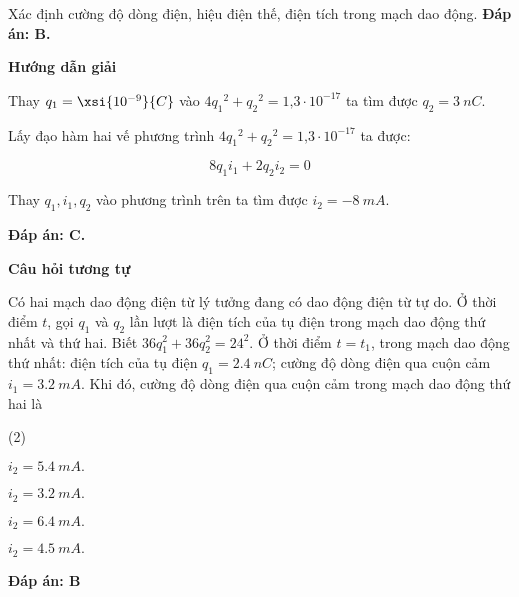 \begin{dang}{Xác định cường độ dòng điện, hiệu điện thế, điện tích trong mạch dao động.}
{		\textbf{Đáp án: B.} 
	}
	{	\begin{center}
			\textbf{Hướng dẫn giải}
		\end{center}
		
		Thay $q_1 = \xsi{10^{-9}}{C}$ vào $4{q_1}^{2}+{q_2}^{2} = \text{1,3}\cdot10^{-17}$ ta tìm được $q_2 = \SI{3}{nC}$. 
		
		Lấy đạo hàm hai vế phương trình $4{q_1}^{2}+{q_2}^{2} = \text{1,3}\cdot10^{-17}$ ta được:
		
		$$8{q_1}{i_1} + 2{q_2}{i_2} = 0$$
		
		Thay $q_1, i_1, q_2$ vào phương trình trên ta tìm được $i_2 = \SI{-8}{mA}.$
		
		\textbf{Đáp án: C.}
		
		
		\begin{center}
			\textbf{Câu hỏi tương tự}
		\end{center}
		
		Có hai mạch dao động điện từ lý tưởng đang có dao động điện từ tự do. Ở thời điểm $t$, gọi $q_1$ và $q_2$ lần lượt là điện tích của tụ điện trong mạch dao động thứ nhất và thứ hai. Biết $36q_1^2 + 36q_2^2 = 24^2$. Ở thời điểm $t = t_1$, trong mạch dao động thứ nhất: điện tích của tụ điện $q_1 = \SI{2,4}{nC}$; cường độ dòng điện qua cuộn cảm $i_1 = \SI{3,2}{mA}$. Khi đó, cường độ dòng điện qua cuộn cảm trong mạch dao động thứ hai là
			\begin{mcq}(2)
		\item $i_2 = \SI{5,4}{mA}.$
		
		\item $i_2 = \SI{3,2}{mA}.$
		
		\item $i_2 = \SI{6,4}{mA}.$
		
		\item $i_2 = \SI{4,5}{mA}.$
			\end{mcq}
		\textbf{Đáp án: B} 
	}
\end{dang}
